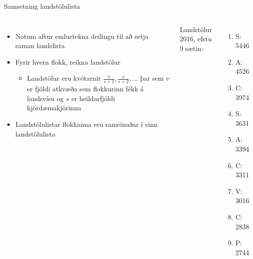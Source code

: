 \documentclass{beamer}
\begin{document}
\begin{frame}{Samsetning landstölulista}
    \begin{columns}
        \begin{itemize}
            \item Notum aftur endurtekna deilingu til að setja saman landslista
            \item Fyrir hvern flokk, reikna landstölur
            \begin{itemize}
                \item Landstölur eru kvótarnir $\frac{v}{s+1}, \frac{v}{s+2},\ldots$ þar sem $v$ er fjöldi atkvæða sem flokkurinn fékk á landsvísu og $s$ er heildarfjöldi kjördæmakjörinna
            \end{itemize}
            \item Landstölulistar flokkanna eru sameinaðar í einn landstölulista
        \end{itemize}
        Landstölur 2016, efstu 9 sætin:
        \begin{enumerate}            
            \item S: 5446
            \item A: 4526
            \item C: 3974
            \item S: 3631
            \item A: 3394
            \item C: 3311
            \item V: 3016
            \item C: 2838
            \item P: 2744
        \end{enumerate}
    \end{columns}
\end{frame}
\end{document}
